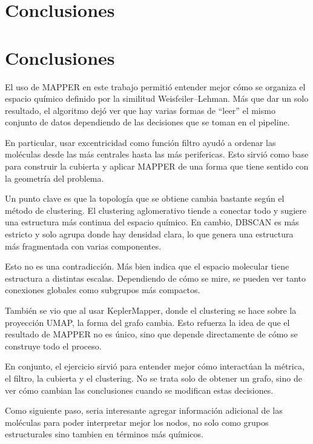 \documentclass[12pt]{article}
\begin{document}
\section{Conclusiones}

\section{Conclusiones}

El uso de MAPPER en este trabajo permitió entender mejor cómo se organiza el espacio químico definido por la similitud Weisfeiler--Lehman. Más que dar un solo resultado, el algoritmo dejó ver que hay varias formas de “leer” el mismo conjunto de datos dependiendo de las decisiones que se toman en el pipeline.

En particular, usar excentricidad como función filtro ayudó a ordenar las moléculas desde las más centrales hasta las más perifericas. Esto sirvió como base para construir la cubierta y aplicar MAPPER de una forma que tiene sentido con la geometría del problema.

Un punto clave es que la topología que se obtiene cambia bastante según el método de clustering. El clustering aglomerativo tiende a conectar todo y sugiere una estructura más continua del espacio químico. En cambio, DBSCAN es más estricto y solo agrupa donde hay densidad clara, lo que genera una estructura más fragmentada con varias componentes.

Esto no es una contradicción. Más bien indica que el espacio molecular tiene estructura a distintas escalas. Dependiendo de cómo se mire, se pueden ver tanto conexiones globales como subgrupos más compactos.

También se vio que al usar KeplerMapper, donde el clustering se hace sobre la proyección UMAP, la forma del grafo cambia. Esto refuerza la idea de que el resultado de MAPPER no es único, sino que depende directamente de cómo se construye todo el proceso.

En conjunto, el ejercicio sirvió para entender mejor cómo interactúan la métrica, el filtro, la cubierta y el clustering. No se trata solo de obtener un grafo, sino de ver cómo cambian las conclusiones cuando se modifican estas decisiones.

Como siguiente paso, seria interesante agregar información adicional de las moléculas para poder interpretar mejor los nodos, no solo como grupos estructurales sino tambien en términos más químicos.
\end{document}
